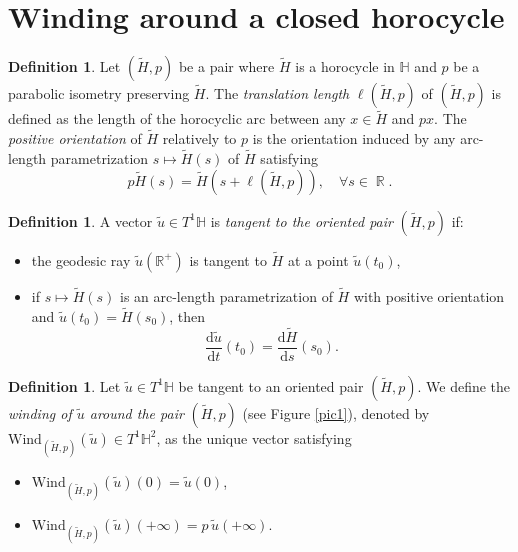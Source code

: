 \documentclass[a4paper,english,reqno]{amsart}
\DeclareMathOperator{\reals}{\mathbb{R}}
\renewcommand{\H}{\mathbb{H}}
\theoremstyle{definition}
\newtheorem{definition}[theorem]{Definition}
\newtheorem{remark}{Remark}
\numberwithin{equation}{section}
\begin{document}
%

\par 

\section{Winding around a closed horocycle}

\begin{definition}
	Let $(\tilde H,p)$ be a pair where $\tilde H$ is a horocycle in $\mathbb{H}$ and $p$ be a parabolic isometry preserving $\tilde H$. The \emph{translation length} $\ell(\tilde H,p)$ of $(\tilde H,p)$ is defined as the length of the horocyclic arc between any $x\in \tilde H$ and $px$.
	The \emph{positive orientation} of $\tilde H$ relatively to $p$ is the orientation induced by any arc-length parametrization $s\mapsto \tilde H(s)$ of $\tilde H$ satisfying \[
	p \tilde H(s) = \tilde H (s+\ell (\tilde H,p)), \quad \forall s\in \reals.
	\]
\end{definition}


\begin{definition}A vector $\tilde u\in T^1 \H$ is \emph{tangent to the oriented pair} $(\tilde H, p)$ if:
	\begin{itemize}
		\item the geodesic ray $\tilde u (\mathbb{R}^+)$ is tangent to $\tilde H$ at a point $\tilde u(t_0)$,
		\item if $s\mapsto \tilde H(s)$ is an arc-length parametrization of $\tilde H$ with positive orientation and $\tilde u(t_0)= \tilde H (s_0)$, then
		\[
		\frac{\mathrm{d}\tilde u}{\mathrm{d} t}(t_0) = \frac{\mathrm{d}\tilde H}{\mathrm{d} s}(s_0).
		\]
	\end{itemize}
\end{definition}

\begin{definition}
	Let $\tilde u\in T^1 \H$ be tangent to an oriented pair $(\tilde H, p)$. 	
	We define the \emph{winding of $\tilde u$ around the pair} $(\tilde H, p)$ (see Figure \ref{pic1}), denoted by $\mathrm{Wind}_{(\tilde H, p)}(\tilde{u})\in T^{1}\mathbb{H}^{2}$, as the unique vector satisfying
	\begin{itemize}
		\item $\mathrm{Wind}_{(\tilde H, p)}(\tilde {u})(0)=\tilde{u}(0)$,
		\item $\mathrm{Wind}_{(\tilde H, p)}(\tilde{u})(+\infty)= p \, \tilde{u}(+\infty) $.
	\end{itemize}
\end{definition}
\end{document}
